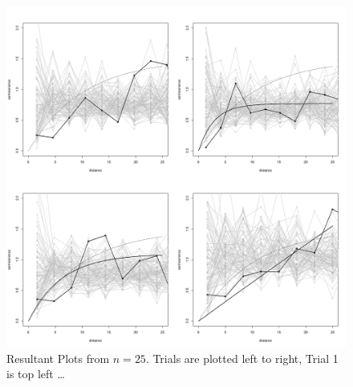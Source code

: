 \documentclass[12pt]{article}
\makeatletter
\theoremstyle{homework}
\newenvironment{exercise}[1]
{\def\@currentlabel{#1}\exercisecore}
{\endexercisecore}
\makeatother
\begin{document}
\begin{exercise}{5}
\begin{enumerate}
\begin{figure}[H]
  \begin{center}
    \caption{Resultant Plots from $n = 25$. Trials are plotted left to right, Trial 1 is top left \dots}
  \includegraphics[width = \textwidth]{Group25.png}
  \end{center}
\end{figure}


\end{enumerate}
\end{exercise}
\end{document}
